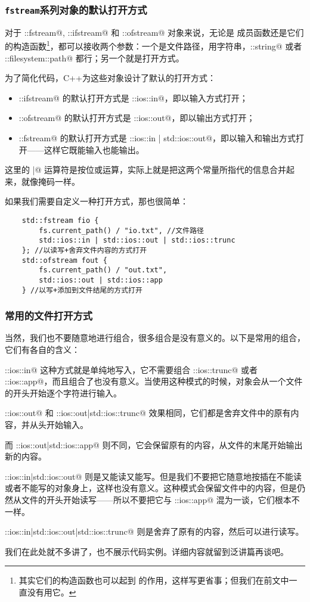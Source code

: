 \subsubsection*{\texttt{fstream}系列对象的默认打开方式}
对于 \lstinline@std::fstream@, \lstinline@std::ifstream@ 和 \lstinline@std::ofstream@ 对象来说，无论是 \lstinline@open@ 成员函数还是它们的构造函数\footnote{其实它们的构造函数也可以起到 \lstinline@open@ 的作用，这样写更省事；但我们在前文中一直没有用它。}，都可以接收两个参数：一个是文件路径，用字符串，\lstinline@std::string@ 或者 \lstinline@std::filesystem::path@ 都行；另一个就是打开方式。\par
为了简化代码，C++为这些对象设计了默认的打开方式：
\begin{itemize}
    \item \lstinline@std::ifstream@ 的默认打开方式是 \lstinline@std::ios::in@，即以输入方式打开；
    \item \lstinline@std::ofstream@ 的默认打开方式是 \lstinline@std::ios::out@，即以输出方式打开；
    \item \lstinline@std::fstream@ 的默认打开方式是 \lstinline@std::ios::in | std::ios::out@，即以输入和输出方式打开——这样它既能输入也能输出。
\end{itemize}
这里的 \lstinline@|@ 运算符是按位或运算，实际上就是把这两个常量所指代的信息合并起来，就像掩码一样。\par
如果我们需要自定义一种打开方式，那也很简单：
\begin{lstlisting}
    std::fstream fio {
        fs.current_path() / "io.txt", //文件路径
        std::ios::in | std::ios::out | std::ios::trunc
    }; //以读写+舍弃文件内容的方式打开
    std::ofstream fout {
        fs.current_path() / "out.txt",
        std::ios::out | std::ios::app
    } //以写+添加到文件结尾的方式打开
\end{lstlisting}\par
\subsubsection*{常用的文件打开方式}
当然，我们也不要随意地进行组合，很多组合是没有意义的。以下是常用的组合，它们有各自的含义：\par
\lstinline@std::ios::in@ 这种方式就是单纯地写入，它不需要组合 \lstinline@std::ios::trunc@ 或者 \lstinline@std::ios::app@，而且组合了也没有意义。当使用这种模式的时候，对象会从一个文件的开头开始逐个字符进行输入。\par
\lstinline@std::ios::out@ 和 \lstinline@std::ios::out|std::ios::trunc@ 效果相同，它们都是舍弃文件中的原有内容，并从头开始输入。\par
而 \lstinline@std::ios::out|std::ios::app@ 则不同，它会保留原有的内容，从文件的末尾开始输出新的内容。\par
\lstinline@std::ios::in|std::ios::out@ 则是又能读又能写。但是我们不要把它随意地按插在不能读或者不能写的对象身上，这样也没有意义。这种模式会保留文件中的内容，但是仍然从文件的开头开始读写——所以不要把它与 \lstinline@std::ios::app@ 混为一谈，它们根本不一样。\par
\lstinline@std::ios::in|std::ios::out|std::ios::trunc@ 则是舍弃了原有的内容，然后可以进行读写。\par
我们在此处就不多讲了，也不展示代码实例。详细内容就留到泛讲篇再谈吧。\par
